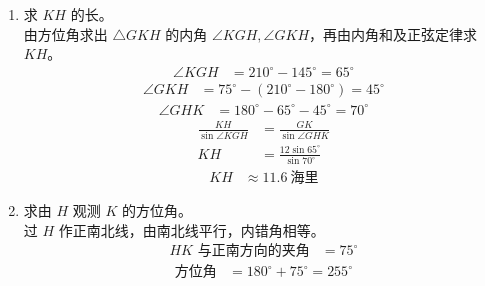 \documentclass[12pt,a4paper]{exam-zh}
\begin{document}
\begin{solution}
    \begin{enumerate}[label=(\alph*)]
        \item 求 $KH$ 的长。 \\
        由方位角求出 $\triangle GKH$ 的内角 $\angle KGH,\angle GKH$，再由内角和及正弦定律求 $KH$。 \\
        \begin{align*}
            \angle KGH &= 210^{\circ}-145^{\circ} = 65^{\circ}
        \end{align*}
        \begin{align*}
            \angle GKH &= 75^{\circ}-(210^{\circ}-180^{\circ}) = 45^{\circ}
        \end{align*}
        \begin{align*}
            \angle GHK &= 180^{\circ}-65^{\circ}-45^{\circ} = 70^{\circ}
        \end{align*}
        \begin{align*}
            \frac{KH}{\sin\angle KGH} &= \frac{GK}{\sin\angle GHK} \\
            KH &= \frac{12\sin65^{\circ}}{\sin70^{\circ}}
        \end{align*}
        \begin{align*}
            KH &\approx 11.6\ \text{海里}
        \end{align*}

        \item 求由 $H$ 观测 $K$ 的方位角。 \\
        过 $H$ 作正南北线，由南北线平行，内错角相等。 \\
        \begin{align*}
            \text{$HK$ 与正南方向的夹角} &= 75^{\circ}
        \end{align*}
        \begin{align*}
            \text{方位角} &= 180^{\circ}+75^{\circ} = 255^{\circ}
        \end{align*}


\end{enumerate}
\end{solution}
\end{document}
